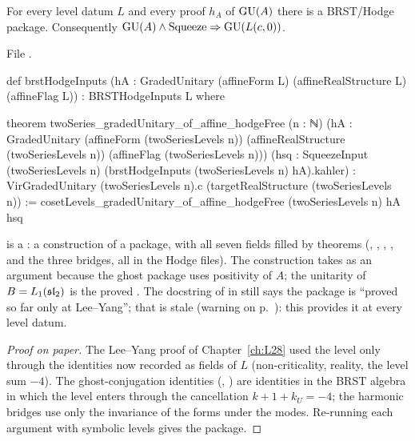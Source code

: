 \begin{theorem}\label{l29:thm:hodge}
For every level datum $L$ and every proof $h_A$ of $\mathrm{GU}(A)$ there is a BRST/Hodge package. Consequently
$\mathrm{GU}(A)\wedge\mathrm{Squeeze}\Rightarrow\mathrm{GU}(L(c,0))$.
\end{theorem}

\noindent File .
\begin{leancode}
def brstHodgeInputs
    (hA : GradedUnitary (affineForm L) (affineRealStructure L) (affineFlag L)) :
    BRSTHodgeInputs L where

theorem twoSeries_gradedUnitary_of_affine_hodgeFree (n : ℕ)
    (hA : GradedUnitary (affineForm (twoSeriesLevels n)) (affineRealStructure (twoSeriesLevels n))
      (affineFlag (twoSeriesLevels n)))
    (hsq : SqueezeInput (twoSeriesLevels n) (brstHodgeInputs (twoSeriesLevels n) hA).kahler) :
    VirGradedUnitary (twoSeriesLevels n).c (targetRealStructure (twoSeriesLevels n)) :=
  cosetLevels_gradedUnitary_of_affine_hodgeFree (twoSeriesLevels n) hA hsq
\end{leancode}

\begin{dictionary}
 is a : a construction of a package, with all seven fields filled by theorems
(, , , , and the three
 bridges, all in the Hodge files). The construction takes  as an argument because the
ghost package uses positivity of $A$; the unitarity of $B=L_1(\mathfrak{sl}_2)$ is the proved
. The docstring of  in  still says
the package is ``proved so far only at Lee--Yang''; that is stale (warning on p.~\pageref{l29:warn:stale}): this 
provides it at every level datum.
\end{dictionary}

\begin{proof}[Proof on paper]
The Lee--Yang proof of Chapter~\ref{ch:L28} used the level only through the identities now recorded as fields of $L$
(non-criticality, reality, the level sum $-4$). The ghost-conjugation identities
(, ) are identities in the BRST algebra in which the level enters
through the cancellation $k+1+k_U=-4$; the harmonic bridges use only the invariance of the forms under the modes.
Re-running each argument with symbolic levels gives the package.
\end{proof}

